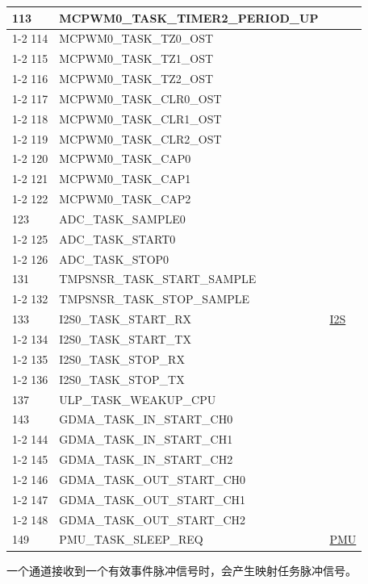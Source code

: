 \documentclass[main\_\_CN.tex]{subfiles}
\begin{document}
\begin{longtable}{ | l | l | l | }
113 & MCPWM0\_TASK\_TIMER2\_PERIOD\_UP      & \\ \cline{1-2}
114 & MCPWM0\_TASK\_TZ0\_OST  & \\ \cline{1-2}
115 & MCPWM0\_TASK\_TZ1\_OST  & \\ \cline{1-2}
116 & MCPWM0\_TASK\_TZ2\_OST  & \\ \cline{1-2}
117 & MCPWM0\_TASK\_CLR0\_OST & \\ \cline{1-2}
118 & MCPWM0\_TASK\_CLR1\_OST & \\ \cline{1-2}
119 & MCPWM0\_TASK\_CLR2\_OST & \\ \cline{1-2}
120 & MCPWM0\_TASK\_CAP0      & \\ \cline{1-2}
121 & MCPWM0\_TASK\_CAP1      & \\ \cline{1-2}
122 & MCPWM0\_TASK\_CAP2      & \\ \hline
123 & ADC\_TASK\_SAMPLE0     & \nameref{mod:adc}   \\ \cline{1-2}
125 & ADC\_TASK\_START0      & \\ \cline{1-2}
126 & ADC\_TASK\_STOP0& \\ \hline
131 & TMPSNSR\_TASK\_START\_SAMPLE  & \nameref{mod:tmpsen}      \\ \cline{1-2}
132 & TMPSNSR\_TASK\_STOP\_SAMPLE   & \\ \hline
133 & I2S0\_TASK\_START\_RX   & \hyperref[mod:i2s]{I2S}   \\ \cline{1-2}
134 & I2S0\_TASK\_START\_TX   & \\ \cline{1-2}
135 & I2S0\_TASK\_STOP\_RX    & \\ \cline{1-2}
136 & I2S0\_TASK\_STOP\_TX    & \\ \hline
137 & ULP\_TASK\_WEAKUP\_CPU & \nameref{mod:ulp} \\ \hline
143 & GDMA\_TASK\_IN\_START\_CH0    & \nameref{mod:dma}  \\ \cline{1-2}
144 & GDMA\_TASK\_IN\_START\_CH1    & \\ \cline{1-2}
145 & GDMA\_TASK\_IN\_START\_CH2    & \\ \cline{1-2}
146 & GDMA\_TASK\_OUT\_START\_CH0   & \\ \cline{1-2}
147 & GDMA\_TASK\_OUT\_START\_CH1   & \\ \cline{1-2}
148 & GDMA\_TASK\_OUT\_START\_CH2   & \\ \hline
149 & PMU\_TASK\_SLEEP\_REQ  & \hyperref[mod:lowpowm]{PMU} \\ \hline
\end{longtable}

一个通道接收到一个有效事件脉冲信号时，会产生映射任务脉冲信号。
\end{document}
